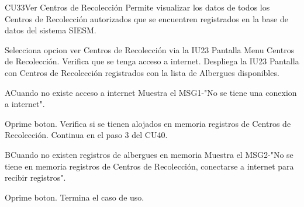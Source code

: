 \begin{UseCase}{CU33}{Ver Centros de Recolección}{
		Permite visualizar los datos de todos los Centros de Recolección autorizados que se encuentren registrados en la base de datos del sistema SIESM.\\
		
}
	
\end{UseCase}



\begin{UCtrayectoria}
	\item \UCactor Selecciona opcion ver Centros de Recolección via la IU23 Pantalla Menu Centros de Recolección.
	\UCpaso Verifica que se tenga acceso a internet.
	\UCpaso Despliega la IU23 Pantalla con Centros de Recolección registrados con la lista de Albergues disponibles.
\end{UCtrayectoria}


\begin{UCtrayectoriaA}{A}{Cuando no existe acceso a internet}
	\UCpaso Muestra el MSG1-"No se tiene una conexion a internet".
	\item \UCactor Oprime boton.
	\UCpaso Verifica si se tienen alojados en memoria registros de Centros de Recolección.
	\UCpaso Continua en el paso 3 del CU40.
\end{UCtrayectoriaA}

\begin{UCtrayectoriaA}{B}{Cuando no existen registros de albergues en memoria}
	\UCpaso Muestra el MSG2-"No se tiene en memoria registros de Centros de Recolección, conectarse a internet para recibir registros".	
	\item \UCactor Oprime boton.
	\UCpaso[] Termina el caso de uso.
\end{UCtrayectoriaA}